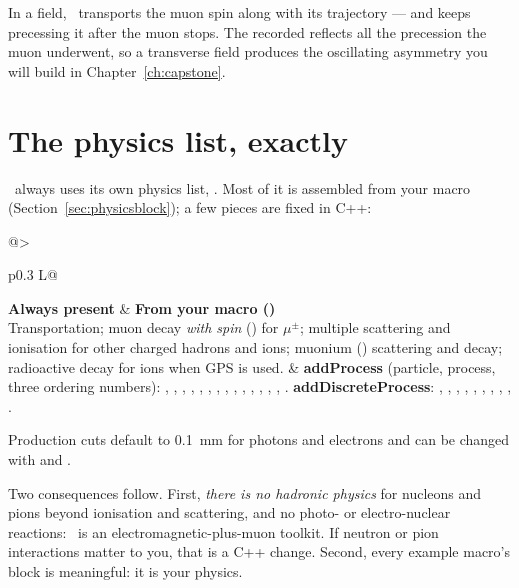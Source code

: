 \begin{keypoint}
In a field, \musrSim\ transports the muon spin along with its trajectory --- and keeps precessing it after the muon stops. The recorded  reflects all the precession the muon underwent, so a transverse field produces the oscillating asymmetry you will build in Chapter~\ref{ch:capstone}.
\end{keypoint}

\section{The physics list, exactly}
\label{sec:physics}
\musrSim\ always uses its own physics list, . Most of it is assembled from your macro (Section~\ref{sec:physicsblock}); a few pieces are fixed in C++:

{\tablestyle
\begin{tabularx}{\textwidth}{@{}>{\raggedright\arraybackslash}p{} L@{}}
\toprule
\textbf{Always present} & \textbf{From your macro ()}\\
\midrule
Transportation; muon decay \emph{with spin} () for \(\mu^\pm\); multiple scattering and ionisation for other charged hadrons and ions; muonium () scattering and decay; radioactive decay for ions when GPS is used. &
\textbf{addProcess} (particle, process, three ordering numbers): , , , , , , , , , , , , , , .\newline
\textbf{addDiscreteProcess}: , , , , , , , , , .\\
\bottomrule
\end{tabularx}}

Production cuts default to \SI{0.1}{mm} for photons and electrons and can be changed with  and .

Two consequences follow. First, \emph{there is no hadronic physics} for nucleons and pions beyond ionisation and scattering, and no photo- or electro-nuclear reactions: \musrSim\ is an electromagnetic-plus-muon toolkit. If neutron or pion interactions matter to you, that is a C++ change. Second, every example macro's  block is meaningful: it is your physics.

